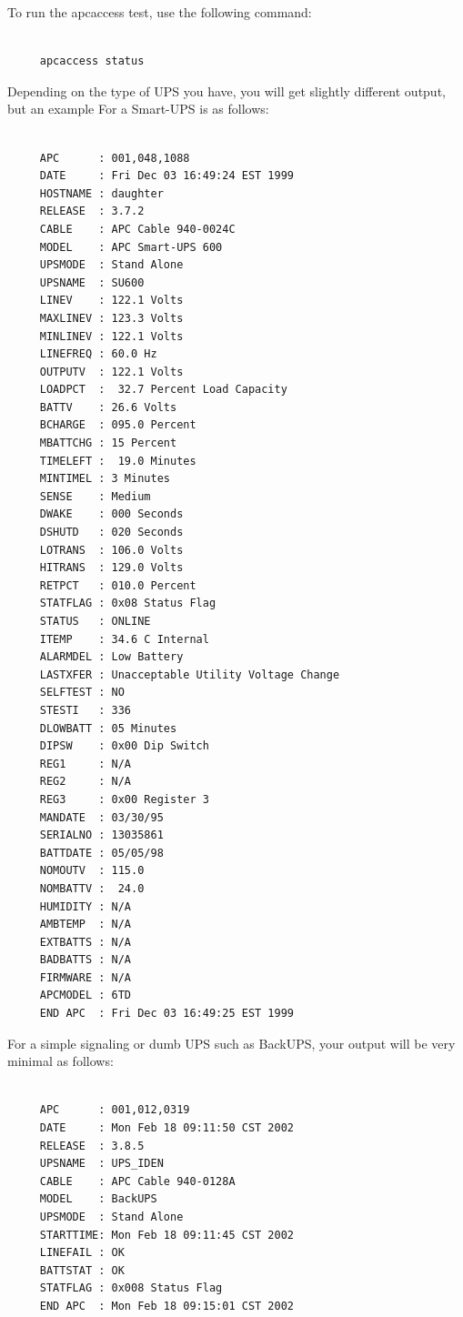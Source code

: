 {{To run the apcaccess test, use the following command: 

\footnotesize
\begin{verbatim}
     
     apcaccess status
\end{verbatim}
\normalsize

Depending on the type of UPS you have, you will get slightly different output,
but an example For a Smart-UPS is as follows: 

\footnotesize
\begin{verbatim}
     
     APC      : 001,048,1088
     DATE     : Fri Dec 03 16:49:24 EST 1999
     HOSTNAME : daughter
     RELEASE  : 3.7.2
     CABLE    : APC Cable 940-0024C
     MODEL    : APC Smart-UPS 600
     UPSMODE  : Stand Alone
     UPSNAME  : SU600
     LINEV    : 122.1 Volts
     MAXLINEV : 123.3 Volts
     MINLINEV : 122.1 Volts
     LINEFREQ : 60.0 Hz
     OUTPUTV  : 122.1 Volts
     LOADPCT  :  32.7 Percent Load Capacity
     BATTV    : 26.6 Volts
     BCHARGE  : 095.0 Percent
     MBATTCHG : 15 Percent
     TIMELEFT :  19.0 Minutes
     MINTIMEL : 3 Minutes
     SENSE    : Medium
     DWAKE    : 000 Seconds
     DSHUTD   : 020 Seconds
     LOTRANS  : 106.0 Volts
     HITRANS  : 129.0 Volts
     RETPCT   : 010.0 Percent
     STATFLAG : 0x08 Status Flag
     STATUS   : ONLINE
     ITEMP    : 34.6 C Internal
     ALARMDEL : Low Battery
     LASTXFER : Unacceptable Utility Voltage Change
     SELFTEST : NO
     STESTI   : 336
     DLOWBATT : 05 Minutes
     DIPSW    : 0x00 Dip Switch
     REG1     : N/A
     REG2     : N/A
     REG3     : 0x00 Register 3
     MANDATE  : 03/30/95
     SERIALNO : 13035861
     BATTDATE : 05/05/98
     NOMOUTV  : 115.0
     NOMBATTV :  24.0
     HUMIDITY : N/A
     AMBTEMP  : N/A
     EXTBATTS : N/A
     BADBATTS : N/A
     FIRMWARE : N/A
     APCMODEL : 6TD
     END APC  : Fri Dec 03 16:49:25 EST 1999
\end{verbatim}
\normalsize

For a simple signaling or dumb UPS such as BackUPS, your output will be very
minimal as follows: 

\footnotesize
\begin{verbatim}
     
     APC      : 001,012,0319
     DATE     : Mon Feb 18 09:11:50 CST 2002
     RELEASE  : 3.8.5
     UPSNAME  : UPS_IDEN
     CABLE    : APC Cable 940-0128A
     MODEL    : BackUPS
     UPSMODE  : Stand Alone
     STARTTIME: Mon Feb 18 09:11:45 CST 2002
     LINEFAIL : OK
     BATTSTAT : OK
     STATFLAG : 0x008 Status Flag
     END APC  : Mon Feb 18 09:15:01 CST 2002
\end{verbatim}
\normalsize

}}
